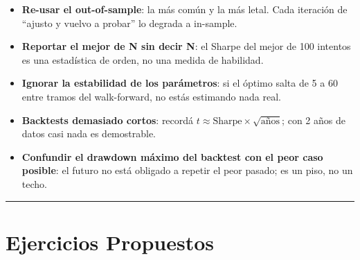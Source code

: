 \documentclass[
  spanish,
  letterpaper,
  DIV=11,
  numbers=noendperiod]{scrreprt}
\providecommand{\tightlist}{%
  \setlength{\itemsep}{0pt}\setlength{\parskip}{0pt}}
\begin{document}
\begin{tcolorbox}[enhanced jigsaw, bottomrule=.15mm, colback=white, opacitybacktitle=0.6, arc=.35mm, toprule=.15mm, opacityback=0, breakable, titlerule=0mm, left=2mm, coltitle=black, colbacktitle=quarto-callout-warning-color!10!white, colframe=quarto-callout-warning-color-frame, leftrule=.75mm, toptitle=1mm, bottomtitle=1mm, title=\textcolor{quarto-callout-warning-color}{\faExclamationTriangle}\hspace{0.5em}{Trampas frecuentes}, rightrule=.15mm]

\begin{itemize}
\tightlist
\item
  \textbf{Re-usar el out-of-sample}: la más común y la más letal. Cada
  iteración de ``ajusto y vuelvo a probar'' lo degrada a in-sample.
\item
  \textbf{Reportar el mejor de N sin decir N}: el Sharpe del mejor de
  100 intentos es una estadística de orden, no una medida de habilidad.
\item
  \textbf{Ignorar la estabilidad de los parámetros}: si el óptimo salta
  de 5 a 60 entre tramos del walk-forward, no estás estimando nada real.
\item
  \textbf{Backtests demasiado cortos}: recordá
  \(t \approx \text{Sharpe} \times \sqrt{\text{años}}\); con 2 años de
  datos casi nada es demostrable.
\item
  \textbf{Confundir el drawdown máximo del backtest con el peor caso
  posible}: el futuro no está obligado a repetir el peor pasado; es un
  piso, no un techo.
\end{itemize}

\end{tcolorbox}

\begin{center}\rule{0.5\linewidth}{0.5pt}\end{center}

\chapter{Ejercicios Propuestos}\label{ejercicios-propuestos-16}
\end{document}
